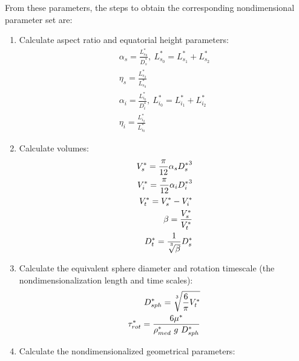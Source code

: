 \documentclass[10pt,a4paper]{article}
\def\non{\nonumber}
\begin{document}
From these parameters, the steps to obtain the corresponding nondimensional parameter set are:
\begin{enumerate}
	\item Calculate aspect ratio and equatorial height parameters:
	\begin{eqnarray}\label{d2ndpars1}
		\alpha_s = \frac{L^*_{s_0}}{D^*_s}, ~ L^*_{s_0} = L^*_{s_1} + L^*_{s_2} \non \\
		\eta_s = \frac{L^*_{s_2}}{L^*_{s_0}} \non \\
		\alpha_{i} = \frac{L^*_{i_0}}{D^*_i}, ~ L^*_{i_0} = L^*_{i_1} + L^*_{i_2} \non \\
		\eta_{i} = \frac{L^*_{i_2}}{L^*_{i_0}}
	\end{eqnarray}
	\item Calculate volumes:
	\begin{eqnarray}\label{d2ndpars2}
		V_s^* = \frac{\pi}{12} \alpha_s {D_s^*}^3 \non \\
		V_i^* = \frac{\pi}{12} \alpha_i {D_i^*}^3 \non \\
		V_t^* = V_s^* - V_i^* \non \\
		\beta = \frac{V_s^*}{V_t^*} \non \\
		D_t^* = \frac{1}{\sqrt[\uproot{5}3]{\beta}} D_s^*
	\end{eqnarray}
	\item Calculate the equivalent sphere diameter and rotation timescale (the nondimensionalization length and time scales):
	\begin{eqnarray}\label{d2ndpars3}
		D_{sph}^* = \sqrt[\uproot{5}3]{\frac{6}{\pi} V_t^*} \non \\
		\tau^*_{rot} = \frac{6 \mu^*}{\rho^*_{med} ~ g ~ D_{sph}^*}
	\end{eqnarray}
	\item Calculate the nondimensionalized geometrical parameters:

\end{enumerate}
\end{document}
